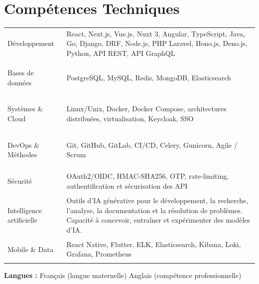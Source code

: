 \documentclass[10pt,a4paper]{article}
\begin{document}
\section{Compétences Techniques}

\begin{tabularx}{\linewidth}{
    @{}
    >{\bfseries\raggedright\arraybackslash}p{3.0cm}
    @{\hspace{8pt}}
    >{\raggedright\arraybackslash}X
    @{}
}

Développement &
React, Next.js, Vue.js, Nuxt 3, Angular,
TypeScript, Java, Go, Django, DRF, Node.js,
PHP Laravel, Hono.js, Deno.js, Python,
API REST, API GraphQL
\\[3pt]

Bases de données &
PostgreSQL, MySQL, Redis, MongoDB,
Elasticsearch
\\[3pt]

Systèmes \& Cloud &
Linux/Unix, Docker, Docker Compose,
architectures distribuées, virtualisation,
Keycloak, SSO
\\[3pt]

DevOps \& Méthodes &
Git, GitHub, GitLab, CI/CD, Celery,
Gunicorn, Agile / Scrum
\\[3pt]

Sécurité &
OAuth2/OIDC, HMAC-SHA256, OTP,
rate-limiting, authentification et sécurisation
des API
\\[3pt]

Intelligence artificielle &
Outils d'IA générative pour le développement,
la recherche, l'analyse, la documentation et
la résolution de problèmes.
Capacité à concevoir, entraîner et
expérimenter des modèles d'IA.
\\[3pt]

Mobile \& Data &
React Native, Flutter, ELK, Elasticsearch,
Kibana, Loki, Grafana, Prometheus

\end{tabularx}


\vspace{3pt}

\noindent
\textbf{Langues :}
Français (langue maternelle)
\quad\textbullet\quad
Anglais (compétence professionnelle)

\end{document}
